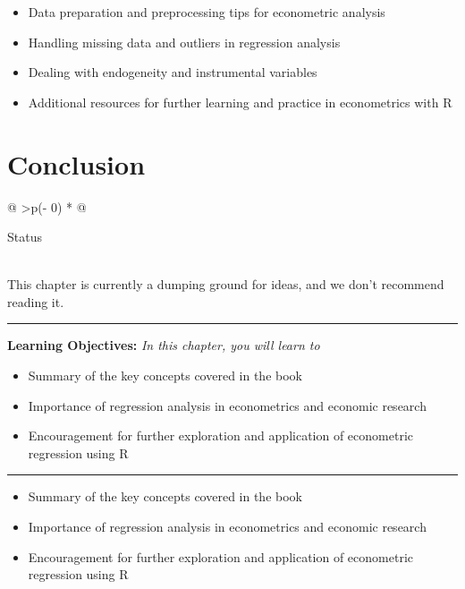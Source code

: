 \documentclass[
  letterpaper,
  twoside,
  openright,
  headsepline,
  footsepline,
  listof = totocnumbered,
  chapterprefix = true,
  titlepage = false]{scrbook}
\providecommand{\abstractname}{Learning Objectives} %
\newenvironment{objectives}[1]{%
	\hrule
	\vspace{5pt}
	\small\textbf{\abstractname: } 
	\newline
	\vspace{0.1cm}
	\small\emph{#1} %
	\itshape %
}{%
	\vspace{5pt}
	\hrule
	\vspace{0.6cm}
}
\begin{document}
\begin{itemize}
\item
  Data preparation and preprocessing tips for econometric analysis
\item
  Handling missing data and outliers in regression analysis
\item
  Dealing with endogeneity and instrumental variables
\item
  Additional resources for further learning and practice in econometrics
  with R
\end{itemize}


\hypertarget{conclusion}{%
\chapter{Conclusion}\label{conclusion}}

\begin{longtable}[]{@{}
  >{\centering\arraybackslash}p{(\columnwidth - 0\tabcolsep) * }@{}}
\toprule\noalign{}
\begin{minipage}[b]{\linewidth}\centering
Status
\end{minipage} \\
\midrule\noalign{}
\endhead
\bottomrule\noalign{}
\endlastfoot
This chapter is currently a dumping ground for ideas, and we don't
recommend reading it. \\
\end{longtable}

\begin{objectives}{In this chapter, you will learn to}
\begin{itemize}

\item{Summary of the key concepts covered in the book}

\item{Importance of regression analysis in econometrics and economic research}

\item{Encouragement for further exploration and application of econometric regression using R}

\end{itemize}

\end{objectives}

\begin{itemize}
\item
  Summary of the key concepts covered in the book
\item
  Importance of regression analysis in econometrics and economic
  research
\item
  Encouragement for further exploration and application of econometric
  regression using R
\end{itemize}
\end{document}
